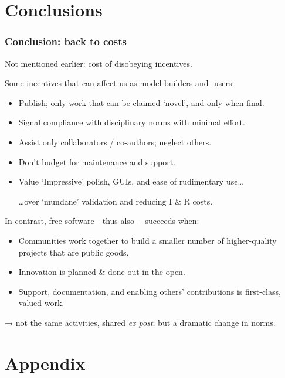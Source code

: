 \documentclass[12pt,aspectratio=169]{beamer}
\begin{document}
\section{Conclusions}
\begin{frame}[allowframebreaks]
\frametitle{Conclusion: back to costs}
Not mentioned earlier: cost of disobeying incentives.

\bigskip
Some incentives that can affect us as model-builders and -users:
\begin{itemize}
  \item Publish; only work that can be claimed ‘novel’, and only when final.
  \item Signal compliance with disciplinary norms with minimal effort.
  \item Assist only collaborators / co-authors; neglect others.
  \item Don't budget for maintenance and support.
  \item Value ‘Impressive’ polish, GUIs, and ease of rudimentary use…

    …over ‘mundane’ validation and reducing I \& R costs.
\end{itemize}

\framebreak
In contrast, free software—thus also —succeeds when:
\begin{itemize}
  \item Communities work together to build a smaller number of higher-quality projects that are public goods.
  \item Innovation is planned \& done out in the open.
  \item Support, documentation, and enabling others' contributions is first-class, valued work.
\end{itemize}

\bigskip
→ not the same activities, shared \emph{ex post}; but a dramatic change in norms.

\bigskip
\hfill {\Large {}}
\end{frame}

\appendix

\section{Appendix}
\end{document}
